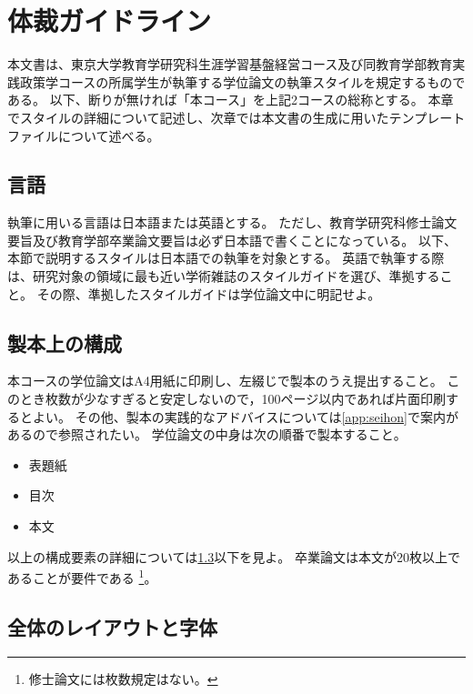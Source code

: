 
\chapter{体裁ガイドライン}
  \label{chp:guideline}

  本文書は、東京大学教育学研究科生涯学習基盤経営コース及び同教育学部教育実践政策学コースの所属学生が執筆する学位論文の執筆スタイルを規定するものである。
  以下、断りが無ければ「本コース」を上記2コースの総称とする。
  本章でスタイルの詳細について記述し、次章では本文書の生成に用いたテンプレートファイルについて述べる。

  \section{言語}
    \label{sub:language}

    執筆に用いる言語は日本語または英語とする。
    ただし、教育学研究科修士論文要旨及び教育学部卒業論文要旨は必ず日本語で書くことになっている。
    以下、本節で説明するスタイルは日本語での執筆を対象とする。
    英語で執筆する際は、研究対象の領域に最も近い学術雑誌のスタイルガイドを選び、準拠すること。
    その際、準拠したスタイルガイドは学位論文中に明記せよ。

  \section{製本上の構成}
    \label{sub:seihon}

    本コースの学位論文はA4用紙に印刷し、左綴じで製本のうえ提出すること。
    このとき枚数が少なすぎると安定しないので，100ページ以内であれば片面印刷するとよい。
    その他、製本の実践的なアドバイスについては\cref{app:seihon}で案内があるので参照されたい。
    学位論文の中身は次の順番で製本すること。

  \begin{itemize}
    \item 表題紙
    \item 目次
    \item 本文
  \end{itemize}

  以上の構成要素の詳細については\cref{sec:layout}以下を見よ。
  卒業論文は本文が20枚以上であることが要件である
  \footnote{修士論文には枚数規定はない。}。

  \section{全体のレイアウトと字体}
    \label{sec:layout}

